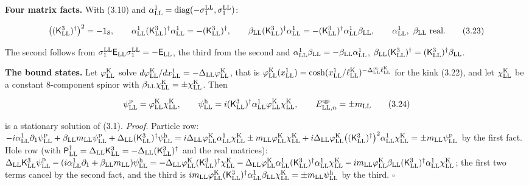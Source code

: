 \documentclass[
  10pt,
]{article}
\begin{document}
\textbf{Four matrix facts.} With (3.10) and
\(\alpha^1_{\rm LL}=\mathrm{diag}(-\sigma^{\rm LL}_1,\sigma^{\rm LL}_1)\):

\[\big((\mathsf K^3_{\rm LL})^\dagger\big)^2=-\mathsf 1_8,\qquad\alpha^1_{\rm LL}(\mathsf K^3_{\rm LL})^\dagger\alpha^1_{\rm LL}=-(\mathsf K^3_{\rm LL})^\dagger,\qquad\beta_{\rm LL}(\mathsf K^3_{\rm LL})^\dagger\alpha^1_{\rm LL}=-(\mathsf K^3_{\rm LL})^\dagger\alpha^1_{\rm LL}\beta_{\rm LL},\qquad\alpha^1_{\rm LL},\ \beta_{\rm LL}\ \text{real}.\tag{3.23}\]

The second follows from
\(\sigma^{\rm LL}_1\mathsf E_{\rm LL}\sigma^{\rm LL}_1=-\mathsf E_{\rm LL}\),
the third from the second and
\(\alpha^1_{\rm LL}\beta_{\rm LL}=-\beta_{\rm LL}\alpha^1_{\rm LL}\),
\(\beta_{\rm LL}(\mathsf K^3_{\rm LL})^\dagger=(\mathsf K^3_{\rm LL})^\dagger\beta_{\rm LL}\).

\textbf{The bound states.} Let \(\varphi^{\rm K}_{\rm LL}\) solve
\(d\varphi^{\rm K}_{\rm LL}/dx^1_{\rm LL}=-\Delta_{\rm LL}\varphi^{\rm K}_{\rm LL}\),
that is
\(\varphi^{\rm K}_{\rm LL}(x^1_{\rm LL})=\cosh(x^1_{\rm LL}/\ell^{\rm K}_{\rm LL})^{-\Delta^\infty_{\rm LL}\ell^{\rm K}_{\rm LL}}\)
for the kink (3.22), and let \(\chi^{\rm K}_{\rm LL}\) be a constant
8-component spinor with
\(\beta_{\rm LL}\chi^{\rm K}_{\rm LL}=\pm\chi^{\rm K}_{\rm LL}\). Then

\[\psi^{\rm p}_{\rm LL}=\varphi^{\rm K}_{\rm LL}\chi^{\rm K}_{\rm LL},\qquad\psi^{\rm h}_{\rm LL}=i(\mathsf K^3_{\rm LL})^\dagger\alpha^1_{\rm LL}\varphi^{\rm K}_{\rm LL}\chi^{\rm K}_{\rm LL},\qquad E^{\rm qp}_{{\rm LL},n}=\pm m_{\rm LL}\tag{3.24}\]

is a stationary solution of (3.1). \emph{Proof.} Particle row:
\(-i\alpha^1_{\rm LL}\partial_1\psi^{\rm p}_{\rm LL}+\beta_{\rm LL}m_{\rm LL}\psi^{\rm p}_{\rm LL}+\Delta_{\rm LL}(\mathsf K^3_{\rm LL})^\dagger\psi^{\rm h}_{\rm LL} =i\Delta_{\rm LL}\varphi^{\rm K}_{\rm LL}\alpha^1_{\rm LL}\chi^{\rm K}_{\rm LL}\pm m_{\rm LL}\varphi^{\rm K}_{\rm LL}\chi^{\rm K}_{\rm LL}+i\Delta_{\rm LL}\varphi^{\rm K}_{\rm LL}\big((\mathsf K^3_{\rm LL})^\dagger\big)^2\alpha^1_{\rm LL}\chi^{\rm K}_{\rm LL}=\pm m_{\rm LL}\psi^{\rm p}_{\rm LL}\)
by the first fact. Hole row (with
\(\mathsf P^\dagger_{\rm LL}=\Delta_{\rm LL}\mathsf K^3_{\rm LL}=-\Delta_{\rm LL}(\mathsf K^3_{\rm LL})^\dagger\)
and the real matrices):
\(\Delta_{\rm LL}\mathsf K^3_{\rm LL}\psi^{\rm p}_{\rm LL}-(i\alpha^1_{\rm LL}\partial_1+\beta_{\rm LL}m_{\rm LL})\psi^{\rm h}_{\rm LL} =-\Delta_{\rm LL}\varphi^{\rm K}_{\rm LL}(\mathsf K^3_{\rm LL})^\dagger\chi^{\rm K}_{\rm LL}-\Delta_{\rm LL}\varphi^{\rm K}_{\rm LL}\alpha^1_{\rm LL}(\mathsf K^3_{\rm LL})^\dagger\alpha^1_{\rm LL}\chi^{\rm K}_{\rm LL}-im_{\rm LL}\varphi^{\rm K}_{\rm LL}\beta_{\rm LL}(\mathsf K^3_{\rm LL})^\dagger\alpha^1_{\rm LL}\chi^{\rm K}_{\rm LL}\);
the first two terms cancel by the second fact, and the third is
\(im_{\rm LL}\varphi^{\rm K}_{\rm LL}(\mathsf K^3_{\rm LL})^\dagger\alpha^1_{\rm LL}\beta_{\rm LL}\chi^{\rm K}_{\rm LL}=\pm m_{\rm LL}\psi^{\rm h}_{\rm LL}\)
by the third. \(\square\)
\end{document}
